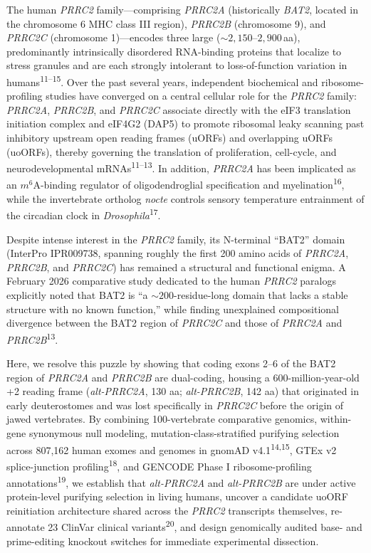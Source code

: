 \documentclass[10pt,letterpaper]{article}
\newcommand{\spname}[1]{\textit{#1}}
\newcommand{\gene}[1]{\textit{#1}}
\newcommand{\refsup}[1]{\textsuperscript{#1}}
\begin{document}
The human \gene{PRRC2} family---comprising \gene{PRRC2A} (historically \gene{BAT2}, located in the chromosome 6 MHC class III region), \gene{PRRC2B} (chromosome 9), and \gene{PRRC2C} (chromosome 1)---encodes three large ($\sim 2,150$--$2,900$\,aa), predominantly intrinsically disordered RNA-binding proteins that localize to stress granules and are each strongly intolerant to loss-of-function variation in humans\refsup{11--15}. Over the past several years, independent biochemical and ribosome-profiling studies have converged on a central cellular role for the \gene{PRRC2} family: \gene{PRRC2A}, \gene{PRRC2B}, and \gene{PRRC2C} associate directly with the eIF3 translation initiation complex and eIF4G2 (DAP5) to promote ribosomal leaky scanning past inhibitory upstream open reading frames (uORFs) and overlapping uORFs (uoORFs), thereby governing the translation of proliferation, cell-cycle, and neurodevelopmental mRNAs\refsup{11--13}. In addition, \gene{PRRC2A} has been implicated as an $m^6\text{A}$-binding regulator of oligodendroglial specification and myelination\refsup{16}, while the invertebrate ortholog \gene{nocte} controls sensory temperature entrainment of the circadian clock in \spname{Drosophila}\refsup{17}.

Despite intense interest in the \gene{PRRC2} family, its N-terminal ``BAT2'' domain (InterPro IPR009738, spanning roughly the first 200 amino acids of \gene{PRRC2A}, \gene{PRRC2B}, and \gene{PRRC2C}) has remained a structural and functional enigma. A February 2026 comparative study dedicated to the human \gene{PRRC2} paralogs explicitly noted that BAT2 is ``a $\sim 200$-residue-long domain that lacks a stable structure with no known function,'' while finding unexplained compositional divergence between the BAT2 region of \gene{PRRC2C} and those of \gene{PRRC2A} and \gene{PRRC2B}\refsup{13}.

Here, we resolve this puzzle by showing that coding exons 2--6 of the BAT2 region of \gene{PRRC2A} and \gene{PRRC2B} are dual-coding, housing a 600-million-year-old +2 reading frame (\gene{alt-PRRC2A}, 130 aa; \gene{alt-PRRC2B}, 142 aa) that originated in early deuterostomes and was lost specifically in \gene{PRRC2C} before the origin of jawed vertebrates. By combining 100-vertebrate comparative genomics, within-gene synonymous null modeling, mutation-class-stratified purifying selection across 807,162 human exomes and genomes in gnomAD v4.1\refsup{14,15}, GTEx v2 splice-junction profiling\refsup{18}, and GENCODE Phase I ribosome-profiling annotations\refsup{19}, we establish that \gene{alt-PRRC2A} and \gene{alt-PRRC2B} are under active protein-level purifying selection in living humans, uncover a candidate uoORF reinitiation architecture shared across the \gene{PRRC2} transcripts themselves, re-annotate 23 ClinVar clinical variants\refsup{20}, and design genomically audited base- and prime-editing knockout switches for immediate experimental dissection.
\end{document}
